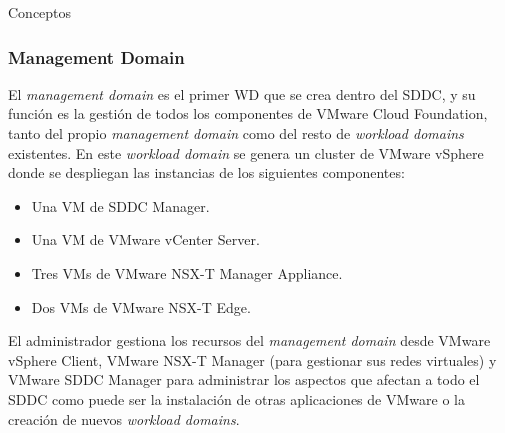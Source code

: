 \begin{section}{Conceptos}
\subsubsection{Management Domain}
\label{subsubsec:domainManagement}
El \textit{management domain} es el primer WD que se crea dentro del SDDC, y su función es la gestión de todos los componentes de VMware Cloud Foundation, tanto del propio \textit{management domain} como del resto de \textit{workload domains} existentes.
En este \textit{workload domain} se genera un cluster de VMware vSphere donde se despliegan las instancias de los siguientes componentes:
\begin{itemize}
  \item Una VM de SDDC Manager.
  \item Una VM de VMware vCenter Server.
  \item Tres VMs de VMware NSX-T Manager Appliance.
  \item Dos VMs de VMware NSX-T Edge.
\end{itemize}
El administrador gestiona los recursos del \textit{management domain} desde VMware vSphere Client, VMware NSX-T Manager (para gestionar sus redes virtuales) y VMware SDDC Manager para administrar los aspectos que afectan a todo el SDDC como puede ser la instalación de otras aplicaciones de VMware o la creación de nuevos \textit{workload domains}. 


\end{section}
